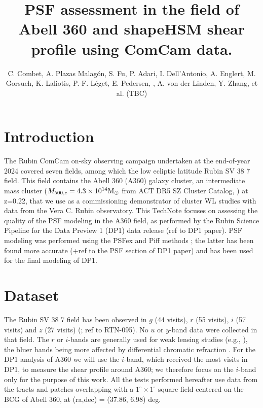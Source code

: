 \documentclass[SE,lsstdraft,authoryear,toc]{lsstdoc}
\title{PSF assessment in the field of Abell 360 and shapeHSM shear profile using ComCam data.}
\author{%
C. Combet, A. Plazas Malagón, S. Fu, P. Adari, I. Dell'Antonio, A. Englert, M. Gorsuch, K. Laliotis, P.-F. Léget, E. Pedersen, , A. von der Linden, Y. Zhang, et al. (TBC) 
}
\date{\vcsDate}
\begin{document}
\maketitle


\section{Introduction}
The Rubin ComCam on-sky observing campaign \citep{SITCOMTN-149} 
undertaken at the end-of-year 2024 covered seven fields, among which the low ecliptic latitude Rubin SV 38 7 field. This field contains the Abell 360 (A360) galaxy cluster, an intermediate mass cluster ($M_{500,c} = 4.3\times 10^{14} \rm{M}_\odot$ from ACT DR5 SZ Cluster Catalog, \citealp{2021ApJS..253....3H}) at z=0.22, that we use as a commissioning demonstrator of cluster WL studies with data from the Vera C. Rubin observatory. This TechNote focuses on assessing the quality of the PSF modeling in the A360 field, as performed by the Rubin Science Pipeline for the Data Preview 1 (DP1) data release (ref to DP1 paper). PSF modeling was performed using the PSFex \citep{2011ASPC..442..435B} and Piff methods \citep{2021MNRAS.501.1282J}; the latter has been found more accurate \citep{SITCOMTN-149}(+ref to the PSF section of DP1 paper) and has been used for the final modeling of DP1.

\section{Dataset}
The Rubin SV 38 7 field has been observed in $g$ (44 visits), $r$ (55 visits), $i$ (57 visits) and $z$ (27 visits) (\citealp{SITCOMTN-149}; ref to RTN-095). No $u$ or $y$-band data were collected in that field. The $r$ or $i$-bands are generally used for weak lensing studies (e.g., \citealp{2018MNRAS.481.3170M}), the bluer bands being more affected by differential chromatic refraction \citep{DMTN-017}. For the DP1 analysis of A360 we will use the $i$-band, which received the most visits in DP1, to measure the shear profile around A360; we therefore focus on the $i$-band only for the purpose of this work. All the tests performed hereafter use data from the tracts and patches overlapping with  a $1^\circ \times 1^\circ$ square field centered on the BCG of Abell 360, at (ra,dec) = (37.86, 6.98) deg. 
\end{document}
